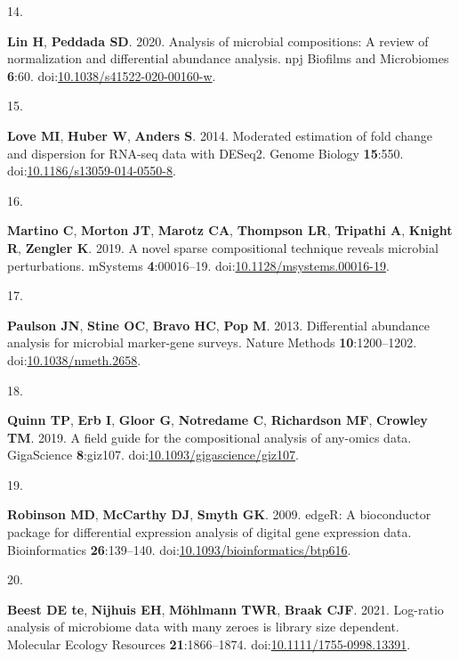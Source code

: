 \documentclass[
]{article}
\newlength{\cslhangindent}
\newlength{\csllabelwidth}
\newlength{\cslentryspacingunit} %
\newenvironment{CSLReferences}[2] %
 {%
  \setlength{\parindent}{0pt}
  \ifodd #1
  \let\oldpar\par
  \def\par{\hangindent=\cslhangindent\oldpar}
  \fi
  \setlength{\parskip}{#2\cslentryspacingunit}
 }%
 {}
\newcommand{\CSLLeftMargin}[1]{\parbox[t]{\csllabelwidth}{#1}}
\newcommand{\CSLRightInline}[1]{\parbox[t]{\linewidth - \csllabelwidth}{#1}\break}
\begin{document}
\begin{CSLReferences}{0}{1}
\leavevmode{}%
\CSLLeftMargin{14. }%
\CSLRightInline{\textbf{Lin H}, \textbf{Peddada SD}. 2020. Analysis of
microbial compositions: A review of normalization and differential
abundance analysis. npj Biofilms and Microbiomes \textbf{6}:60.
doi:\href{https://doi.org/10.1038/s41522-020-00160-w}{10.1038/s41522-020-00160-w}.}

\leavevmode{}%
\CSLLeftMargin{15. }%
\CSLRightInline{\textbf{Love MI}, \textbf{Huber W}, \textbf{Anders S}.
2014. Moderated estimation of fold change and dispersion for {RNA}-seq
data with {DESeq}2. Genome Biology \textbf{15}:550.
doi:\href{https://doi.org/10.1186/s13059-014-0550-8}{10.1186/s13059-014-0550-8}.}

\leavevmode{}%
\CSLLeftMargin{16. }%
\CSLRightInline{\textbf{Martino C}, \textbf{Morton JT}, \textbf{Marotz
CA}, \textbf{Thompson LR}, \textbf{Tripathi A}, \textbf{Knight R},
\textbf{Zengler K}. 2019. A novel sparse compositional technique reveals
microbial perturbations. {mSystems} \textbf{4}:00016--19.
doi:\href{https://doi.org/10.1128/msystems.00016-19}{10.1128/msystems.00016-19}.}

\leavevmode{}%
\CSLLeftMargin{17. }%
\CSLRightInline{\textbf{Paulson JN}, \textbf{Stine OC}, \textbf{Bravo
HC}, \textbf{Pop M}. 2013. Differential abundance analysis for microbial
marker-gene surveys. Nature Methods \textbf{10}:1200--1202.
doi:\href{https://doi.org/10.1038/nmeth.2658}{10.1038/nmeth.2658}.}

\leavevmode{}%
\CSLLeftMargin{18. }%
\CSLRightInline{\textbf{Quinn TP}, \textbf{Erb I}, \textbf{Gloor G},
\textbf{Notredame C}, \textbf{Richardson MF}, \textbf{Crowley TM}. 2019.
A field guide for the compositional analysis of any-omics data.
{GigaScience} \textbf{8}:giz107.
doi:\href{https://doi.org/10.1093/gigascience/giz107}{10.1093/gigascience/giz107}.}

\leavevmode{}%
\CSLLeftMargin{19. }%
\CSLRightInline{\textbf{Robinson MD}, \textbf{McCarthy DJ},
\textbf{Smyth GK}. 2009. {edgeR}: A bioconductor package for
differential expression analysis of digital gene expression data.
Bioinformatics \textbf{26}:139--140.
doi:\href{https://doi.org/10.1093/bioinformatics/btp616}{10.1093/bioinformatics/btp616}.}

\leavevmode{}%
\CSLLeftMargin{20. }%
\CSLRightInline{\textbf{Beest DE te}, \textbf{Nijhuis EH},
\textbf{Möhlmann TWR}, \textbf{Braak CJF}. 2021. Log-ratio analysis of
microbiome data with many zeroes is library size dependent. Molecular
Ecology Resources \textbf{21}:1866--1874.
doi:\href{https://doi.org/10.1111/1755-0998.13391}{10.1111/1755-0998.13391}.}


\end{CSLReferences}
\end{document}
